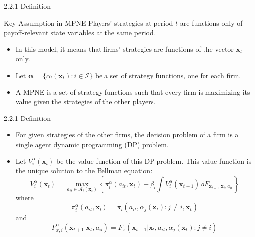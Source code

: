 \documentclass[aspectratio=169]{beamer}  %
\begin{document}
\begin{frame}{2.2.1 Definition}
    \begin{block}{Key Assumption in MPNE}
        Players’ strategies at period \(t\) are functions only of payoff-relevant state variables at the same period.
    \end{block}
    \begin{itemize}
        \item In this model, it means that firms' strategies are functions of the vector \( \mathbf{x}_t \) only.
        \item Let \( \boldsymbol{\alpha} = \{\alpha_i(\mathbf{x}_t) : i \in \mathcal{I}\} \) be a set of strategy functions, one for each firm.
        \item A MPNE is a set of strategy functions such that every firm is maximizing its value given the strategies of the other players.
        
    \end{itemize}
\end{frame}



\begin{frame}
{2.2.1 Definition}
\begin{itemize}
    \item For given strategies of the other firms, the decision problem of a firm is a single agent dynamic programming (DP) problem.
    \item Let $V_i^\alpha(\mathbf{x}_t)$ be the value function of this DP problem. This value function is the unique solution to the Bellman equation:
    \begin{equation}\label{1}
        V_i^\alpha(\mathbf{x}_t) = \max_{a_{it} \in \mathcal{A}_i(\mathbf{x}_t)} \left\{ \pi_i^\alpha(a_{it}, \mathbf{x}_t) + \beta_i \int V_i^\alpha(\mathbf{x}_{t+1}) \, dF_{\mathbf{x}_{t+1}|\mathbf{x}_t, a_{it}} \right\}
    \end{equation}
    where 
    \[
    \pi_i^\alpha(a_{it}, \mathbf{x}_t) = \pi_i(a_{it}, \alpha_j(\mathbf{x}_t) : j \neq i, \mathbf{x}_t)
    \]
    and 
    \[
    F_{x,i}^\alpha(\mathbf{x}_{t+1}|\mathbf{x}_t, a_{it}) = F_x(\mathbf{x}_{t+1}|\mathbf{x}_t, a_{it}, \alpha_j(\mathbf{x}_t) : j \neq i)
    \]
    \end{itemize}
\end{frame}
\end{document}
